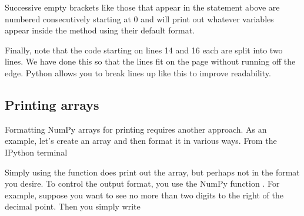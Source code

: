 \documentclass[letterpaper,10pt,english]{sphinxmanual}
\begin{document}
\sphinxAtStartPar
Successive empty brackets \sphinxcode{\sphinxupquote{\{\}}} like those that appear in the statement above  are numbered consecutively starting at 0 and will print out whatever variables appear inside the  method using their default format.

\sphinxAtStartPar
Finally, note that the code starting on lines 14 and 16 each are split into two lines.  We have done this so that the lines fit on the page without running off the edge.  Python allows you to break lines up like this to improve readability.


\subsection{Printing arrays}
\label{\detokenize{chap4/chap4_io:printing-arrays}}
\ignorespaces 
\sphinxAtStartPar
Formatting NumPy arrays for printing requires another approach.  As an example, let’s create an array and then format it in various ways.  From the IPython terminal

\begin{sphinxVerbatim}[commandchars=\\\{\}]
    
\PYG{g+go}{[  3.           5.66666667   8.33333333  11.}
\PYG{g+go}{   13.66666667  16.33333333  19.        ]}
\end{sphinxVerbatim}

\sphinxAtStartPar
Simply using the  function does print out the array, but perhaps not in the format you desire.  To control the output format, you use the NumPy function .  For example, suppose you want to see no more than two digits to the right of the decimal point.  Then you simply write

\begin{sphinxVerbatim}[commandchars=\\\{\}]
\end{sphinxVerbatim}
\end{document}
